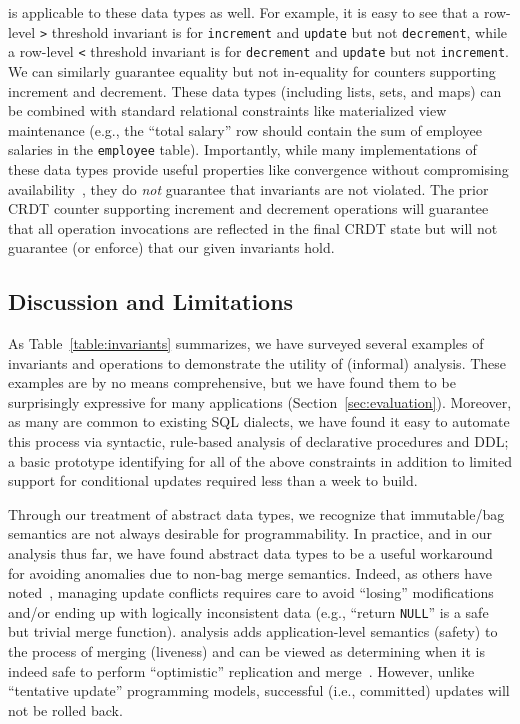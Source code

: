 \iconfluence is applicable to these data types as well. For example,
it is easy to see that a row-level \texttt{>} threshold invariant is
\iconfluent for \texttt{increment} and \texttt{update} but not
\texttt{decrement}, while a row-level \texttt{<} threshold invariant
is \iconfluent for \texttt{decrement} and \texttt{update} but not
\texttt{increment}. We can similarly guarantee equality but not
in-equality for counters supporting increment and decrement. These
data types (including lists, sets, and maps) can be combined with
standard relational constraints like materialized view maintenance
(e.g., the ``total salary'' row should contain the sum of employee
salaries in the \texttt{employee} table). Importantly, while many
implementations of these data types provide useful properties like
convergence without compromising availability~\cite{blooml,crdt}, they
do \textit{not} guarantee that invariants are not violated. The prior
CRDT counter supporting increment and decrement operations will
guarantee that all operation invocations are reflected in the final
CRDT state but will not guarantee (or enforce) that our given
invariants hold.

\subsection{Discussion and Limitations}

As Table~\ref{table:invariants} summarizes, we have surveyed several
examples of invariants and operations to demonstrate the utility of
(informal) \iconfluence analysis. These examples are by no means
comprehensive, but we have found them to be surprisingly expressive
for many applications (Section~\ref{sec:evaluation}). Moreover, as
many are common to existing SQL dialects, we have found it easy to
automate this process via syntactic, rule-based analysis of
declarative procedures and DDL; a basic prototype identifying
\iconfluence for all of the above constraints in addition to limited
support for conditional updates required less than a week to build.

Through our treatment of abstract data types, we recognize that
immutable/bag semantics are not always desirable for
programmability. In practice, and in our analysis thus far, we have
found abstract data types to be a useful workaround for avoiding
anomalies due to non-bag merge semantics. Indeed, as others have
noted~\cite{bayou,gray-book}, managing update conflicts requires care
to avoid ``losing'' modifications and/or ending up with logically
inconsistent data (e.g., ``return \texttt{NULL}'' is a safe but
trivial merge function). \iconfluence analysis adds application-level
semantics (safety) to the process of merging (liveness) and can be
viewed as determining when it is indeed safe to perform ``optimistic''
replication and merge~\cite{optimistic}. However, unlike ``tentative
update'' programming models, successful (i.e., committed) updates will
not be rolled back.

